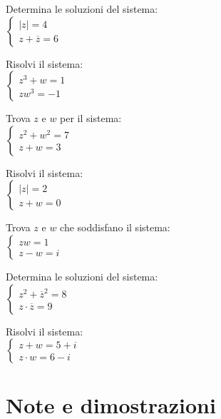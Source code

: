 \documentclass[letterpaper,10pt,italian]{jupyterBook}
\begin{document}
\sphinxAtStartPar
{} Determina le soluzioni del sistema:\\
\(\begin{cases} 
   |z| = 4 \\
   z + \overline{z} = 6 
   \end{cases}\)

\sphinxAtStartPar
{} Risolvi il sistema:\\
\(\begin{cases} 
   z^3 + w = 1 \\
   z w^3 = -1 
   \end{cases}\)

\sphinxAtStartPar
{} Trova \(z\) e \(w\) per il sistema:\\
\(\begin{cases} 
   z^2 + w^2 = 7 \\
   z + w = 3 
   \end{cases}\)

\sphinxAtStartPar
{} Risolvi il sistema:\\
\(\begin{cases} 
   |z| = 2 \\
   z + w = 0 
   \end{cases}\)

\sphinxAtStartPar
{} Trova \(z\) e \(w\) che soddisfano il sistema:\\
\(\begin{cases} 
   z w = 1 \\
   z - w = i 
   \end{cases}\)

\sphinxAtStartPar
{} Determina le soluzioni del sistema:\\
\(\begin{cases} 
   z^2 + \overline{z}^2 = 8 \\
   z \cdot \overline{z} = 9 
   \end{cases}\)

\sphinxAtStartPar
{} Risolvi il sistema:\\
\(\begin{cases} 
    z + w = 5 + i \\
    z \cdot w = 6 - i 
    \end{cases}\)

\sphinxstepscope


\section{Note e dimostrazioni}
\label{\detokenize{ch/algebra/complex-algebra-notes:note-e-dimostrazioni}}\label{\detokenize{ch/algebra/complex-algebra-notes:math-hs-algebra-complex-notes}}\label{\detokenize{ch/algebra/complex-algebra-notes::doc}}
\end{document}
